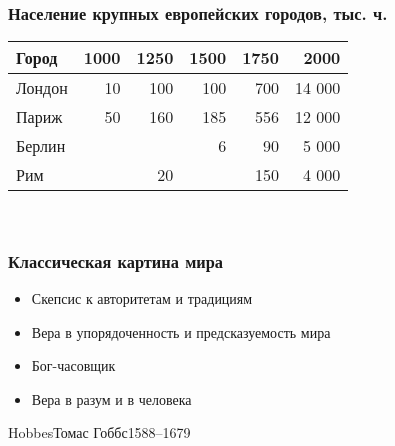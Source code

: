 \documentclass[aspectratio=169]{beamer}
\begin{document}

\begin{bframe}\frametitle{Население крупных европейских городов, тыс. ч.}
\begin{center}
\begin{tabular}{l| r r r r r}
\hline \hline
Город      & 1000         & 1250        & 1500          & 1750             & 2000           \\
\hline \hline
Лондон     & 10           & 100          & 100           & 700              & 14 000         \\
Париж      & 50           & 160          & 185           & 556              & 12 000         \\
Берлин     &              &              & 6             & 90               & 5 000          \\
Рим        &              & 20           &               & 150              & 4 000          \\
\hline \hline 
\end{tabular}\\[10pt]

\end{center}
\end{bframe}






\begin{bframe}\frametitle{Классическая картина мира}
\begin{itemize}
\item<+-> Скепсис к авторитетам и традициям
\item<+-> Вера в упорядоченность и предсказуемость мира
\item<+-> Бог-часовщик
\item<+-> Вера в разум и в человека
\end{itemize} 
\end{bframe}


\begin{Person}{Hobbes}{Томас Гоббс}{1588--1679}

\end{Person}
\end{document}
